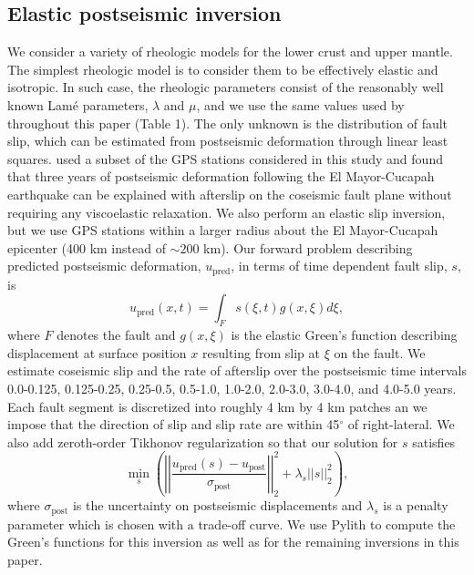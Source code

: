 \subsection{Elastic postseismic inversion}\label{ch3:sec:ElasticInversion}    
We consider a variety of rheologic models for the lower crust and
upper mantle. The simplest rheologic model is to consider them to be
effectively elastic and isotropic.  In such case, the rheologic
parameters consist of the reasonably well known Lam\'e parameters,
$\lambda$ and $\mu$, and we use the same values used by
\citet{Wei2011} throughout this paper (Table 1).  The only unknown is
the distribution of fault slip, which can be estimated from
postseismic deformation through linear least squares.
\citet{Rollins2015} used a subset of the GPS stations considered in
this study and found that three years of postseismic deformation
following the El Mayor-Cucapah earthquake can be explained with
afterslip on the coseismic fault plane without requiring any
viscoelastic relaxation. We also perform an elastic slip inversion,
but we use GPS stations within a larger radius about the El
Mayor-Cucapah epicenter (400 km instead of ${\sim}200$ km). Our
forward problem describing predicted postseismic deformation,
$u_\mathrm{pred}$, in terms of time dependent fault slip, $s$, is
\begin{equation}\label{ch3:eq:ElasticForward}
  u_\mathrm{pred}(x,t) = \int_F s(\xi,t)g(x,\xi)d\xi, 
\end{equation}           
where $F$ denotes the fault and $g(x,\xi)$ is the elastic Green's
function describing displacement at surface position $x$ resulting
from slip at $\xi$ on the fault.  We estimate coseismic slip and the
rate of afterslip over the postseismic time intervals 0.0-0.125,
0.125-0.25, 0.25-0.5, 0.5-1.0, 1.0-2.0, 2.0-3.0, 3.0-4.0, and 4.0-5.0
years.  Each fault segment is discretized into roughly 4 km by 4 km
patches an we impose that the direction of slip and slip rate are
within 45$^\circ$ of right-lateral. We also add zeroth-order Tikhonov
regularization so that our solution for $s$ satisfies
\begin{equation}\label{ch3:eq:ElasticObjective}
  \min_s \left(\left|\left|\frac{u_\mathrm{pred}(s) - u_\mathrm{post}}                
                                {\sigma_\mathrm{post}}\right|\right|_2^2 + 
                                \lambda_s||s||_2^2\right),
\end{equation}
where $\sigma_\mathrm{post}$ is the uncertainty on postseismic
displacements and $\lambda_s$ is a penalty parameter which is chosen
with a trade-off curve.  We use Pylith \citep{Aagaard2013} to compute
the Green's functions for this inversion as well as for the remaining
inversions in this paper.

